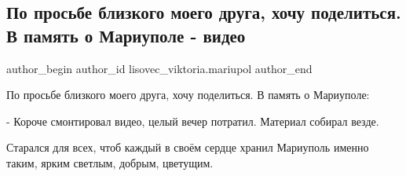 
 
 
 
 

\subsection{По просьбе близкого моего друга, хочу поделиться. В память о Мариуполе - видео}
\label{sec:07_02_2023.fb.lisovec_viktoria.mariupol.1.po_prosbe_blizkogo_m}

\ifcmt
 author_begin
   author_id lisovec_viktoria.mariupol
 author_end
\fi

По просьбе близкого моего друга, хочу поделиться. В память о Мариуполе:

- Короче смонтировал видео, целый вечер потратил. Материал собирал везде.

Старался для всех, чтоб каждый в своём сердце хранил Мариуполь именно таким,
ярким  светлым, добрым, цветущим.



